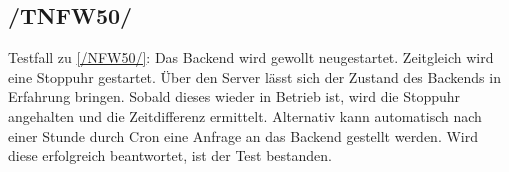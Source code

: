 \subsection*{/TNFW50/}

\label{/TNFW50/} Testfall zu \ref{/NFW50/}: Das \Gls{Backend} wird gewollt neugestartet. Zeitgleich wird eine Stoppuhr gestartet.
Über den \Gls{Server} lässt sich der Zustand des \Gls{Backend}s in Erfahrung bringen.
Sobald dieses wieder in Betrieb ist, wird die Stoppuhr angehalten und die Zeitdifferenz ermittelt.
Alternativ kann automatisch nach einer Stunde durch \Gls{Cron} eine Anfrage an das \Gls{Backend} gestellt werden.
Wird diese erfolgreich beantwortet, ist der Test bestanden.